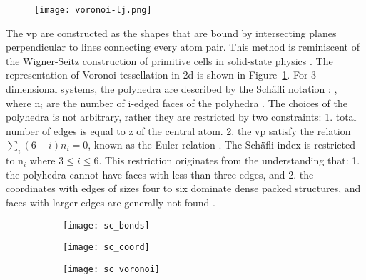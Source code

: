 \begin{figure}[h] \centering
	\texttt{[image: voronoi-lj.png]}
	\label{f:ljvoro}
\end{figure}

The \gls{vp} are constructed as the shapes that are bound by intersecting planes perpendicular to lines connecting every atom pair. This method is reminiscent of the Wigner-Seitz construction of primitive cells in solid-state physics \cite{Kittel2004}. The representation of Voronoi tessellation in \gls{2d} is shown in Figure~\ref{f:ljvoro}. For 3 dimensional systems, the polyhedra are described by the Sch\"afli notation \cite{Coxeter1973}: , where n$_i$ are the number of i-edged faces of the polyhedra \cite{Coxeter1973,Brostow1998}. The choices of the polyhedra is not arbitrary, rather they are restricted by two constraints: 1. total number of edges is equal to \gls{z} of the central atom. 2. the \gls{vp} satisfy the relation $\sum _i (6-i)n_i = 0$, known as the Euler relation \cite{Finney1970}. The   Sch\"afli index is restricted to n$_i$ where $3 \leq i \leq 6$. This restriction originates from the understanding that: 1. the polyhedra cannot have faces with less than three edges, and 2. the coordinates with edges of sizes four to six dominate dense packed structures, and faces with larger edges are generally not found \cite{Borodin1999}. \par

\begin{figure}
	\begin{subfigure}{0.33\textwidth}	 \centering		\texttt{[image: sc\_bonds]} 
		 \end{subfigure}%
	\hfill
	\begin{subfigure}{0.33\textwidth}	\centering  	\texttt{[image: sc\_coord]}
	 \end{subfigure}%
	\hfill
	\begin{subfigure}{0.33\textwidth}	\centering  	 \texttt{[image: sc\_voronoi]} 
		  \end{subfigure}%
	\label{f:voronoi-sch}
\end{figure} 

